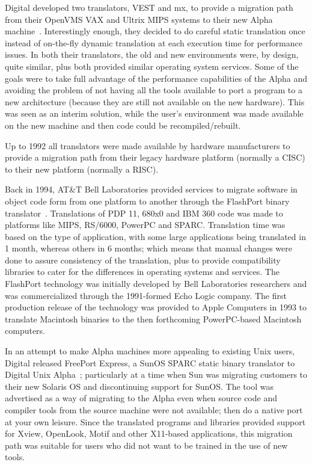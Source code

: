 Digital developed two translators, VEST and mx, to provide a migration
path from their OpenVMS VAX and Ultrix MIPS systems to their new
Alpha machine~\cite{Site92,Site93}.  Interestingly enough, they
decided to do careful static translation once instead of on-the-fly
dynamic translation at each execution time for performance issues.
In both their translators, the old and new environments were, by
design, quite similar, plus both provided similar operating system
services.  Some of the goals were to take full advantage of the
performance capabilities of the Alpha and avoiding the problem of
not having all the tools available to port a program to a new architecture
(because they are still not available on the new hardware).
This was seen as an interim solution, while the user's environment was
made available on the new machine and then code could be recompiled/rebuilt.

Up to 1992 all translators were made available by hardware                   
manufacturers to provide a migration path from their legacy
hardware platform (normally a CISC) to their new platform
(normally a RISC).

Back in 1994, AT\&T Bell Laboratories provided services to migrate
software in object code form from one platform to another through
the FlashPort binary translator~\cite{Att94}.
Translations of PDP 11, 680x0 and IBM 360 code was made to
platforms like MIPS, RS/6000, PowerPC and SPARC.  Translation
time was based on the type of application, with some large
applications being translated in 1 month, whereas others in
6 months; which means that manual changes were done to assure
consistency of the translation, plus to provide compatibility
libraries to cater for the differences in operating systems and
services.
The FlashPort technology was initially developed by Bell Laboratories
researchers and was commercialized through the 1991-formed Echo
Logic company.  The first production release of the technology
was provided to Apple Computers in 1993 to translate Macintosh
binaries to the then forthcoming PowerPC-based Macintosh computers.

In an attempt to make Alpha machines more appealing to existing
Unix users, Digital released FreePort Express, a SunOS SPARC
static binary translator to Digital Unix Alpha~\cite{Dec95};
particularly at a time when Sun was migrating customers to
their new Solaris OS and discontinuing support for SunOS.
The tool was advertised as a way of migrating to the Alpha even
when source code and compiler tools from the source machine
were not available; then do a native port at your own leisure.
Since the translated programs and libraries provided support for
Xview, OpenLook, Motif and other X11-based applications, this
migration path was suitable for users who did not want to be
trained in the use of new tools.

